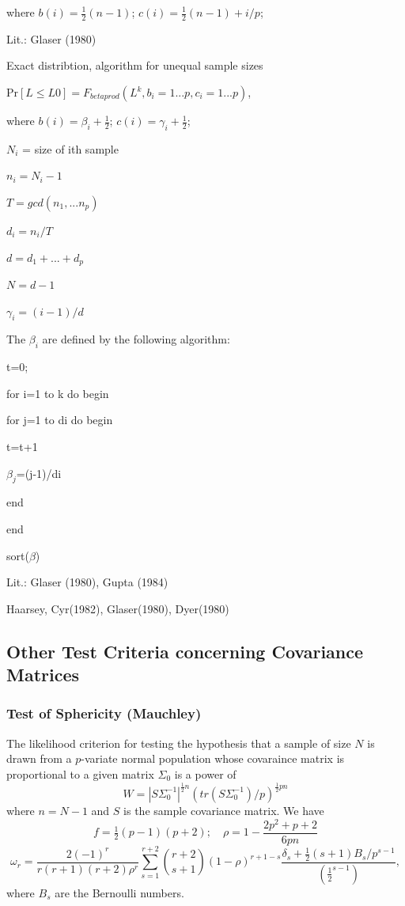 where $b(i)=\tfrac{1}{2}(n-1)$;   $c(i)=\tfrac{1}{2}(n-1)+i/p$;

Lit.: Glaser (1980)


\vpara
Exact distribtion, algorithm for unequal sample sizes

Pr$[L \leq L0] = F_{betaprod}(L^k,b_i=1...p,c_i=1...p)$,

where $b(i)=\beta_i + \tfrac{1}{2}$;   $c(i)=\gamma_i + \tfrac{1}{2}$;

$N_i$ = size of ith sample

$n_i = N_i-1$

$T  = gcd(n_1,...n_p)$

$d_i = n_i/T$

$d  = d_1 + ... + d_p$

$N  = d-1$

$\gamma_i=(i-1)/d$


\vpara
The $\beta_i$ are defined by the following algorithm:

t=0;

for i=1 to k do begin

for j=1 to di do begin

t=t+1

$\beta_j$=(j-1)/di

end

end

sort($\beta$)

\vpara
Lit.: Glaser (1980), Gupta (1984)


\cite{Nagarsenker_1984}


Haarsey, 	Cyr(1982), 	Glaser(1980), 	Dyer(1980)





\subsection{Other Test Criteria concerning Covariance Matrices}
\label{BoxDavis:Other Test Criteria concerning Covariance Matrices}



\subsubsection{Test of Sphericity (Mauchley)}
The likelihood criterion for testing the hypothesis that a sample of size $N$ is drawn from a $p$-variate normal population whose covaraince matrix is proportional to a given matrix $\Sigma_0$ is a power of
\begin{equation}
	W = |S \Sigma_0^{-1}|^{\tfrac{1}{2}n} \left(tr(S \Sigma_0^{-1})/p \right)^{\tfrac{1}{2}pn}
\end{equation}
where $n=N-1$ and $S$ is the sample covariance matrix. We have
\begin{equation}
	f=\tfrac{1}{2}(p-1)(p+2); \quad \rho=1-\frac{2p^2+p+2}{6pn}
\end{equation}
\begin{equation}
	\omega_r = \frac{2(-1)^r}{r(r+1)(r+2) \rho^r} \sum_{s=1}^{r+2} \binom{r+2}{s+1} (1-\rho)^{r+1-s} \frac{\delta_s + \tfrac{1}{2}(s+1) B_s / p^{s-1}}{(\tfrac{1}{2}^{s-1})}, 
\end{equation}
where $B_s$ are the Bernoulli numbers.


